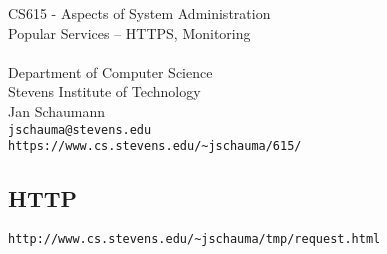\documentclass[xga]{xdvislides}
\begin{document}
\setfontphv

\lhead{\slidetitle}                               %
\cfoot{\relax}                               %
\rfoot{\Gray{\today}}

\newcommand{\smallish}{\fontsize{16}{16}\selectfont}

\vspace*{\fill}
\begin{center}
	\Hugesize
		CS615 - Aspects of System Administration\\ [1em]
		Popular Services -- HTTPS, Monitoring\\ [1em]
	\hspace*{5mm}\blueline\\ [1em]
	\Normalsize
		Department of Computer Science\\
		Stevens Institute of Technology\\
		Jan Schaumann\\
		\verb+jschauma@stevens.edu+\\
		\verb+https://www.cs.stevens.edu/~jschauma/615/+
\end{center}
\vspace*{\fill}

\subsection{HTTP}
\begin{verbatim}
http://www.cs.stevens.edu/~jschauma/tmp/request.html
\end{verbatim}
\end{document}
